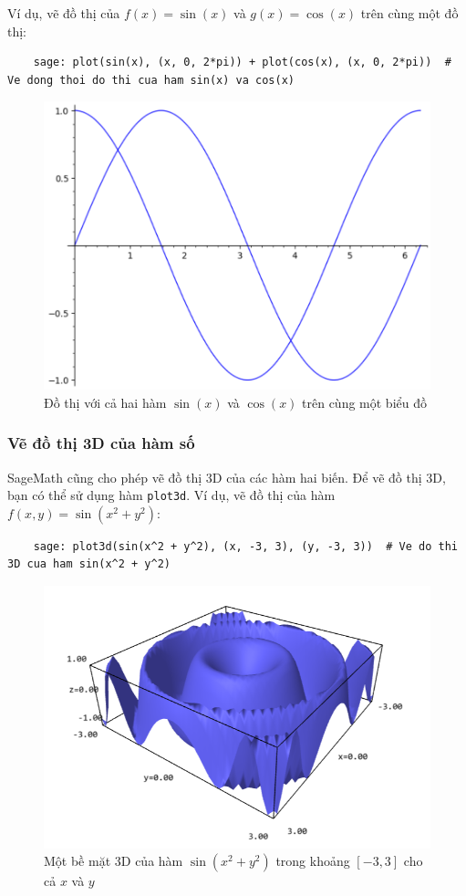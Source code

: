Ví dụ, vẽ đồ thị của \( f(x) = \sin(x) \) và \( g(x) = \cos(x) \) trên cùng một đồ thị:

\begin{lstlisting}
	sage: plot(sin(x), (x, 0, 2*pi)) + plot(cos(x), (x, 0, 2*pi))  # Ve dong thoi do thi cua ham sin(x) va cos(x)
\end{lstlisting}
\begin{figure}
	\centering
	\includegraphics[width=0.5\linewidth]{images/screenshot009}
	\caption{Đồ thị với cả hai hàm \(\sin(x)\) và \(\cos(x)\) trên cùng một biểu đồ}
	\label{fig:screenshot009}
\end{figure}

\subsubsection{Vẽ đồ thị 3D của hàm số}

SageMath cũng cho phép vẽ đồ thị 3D của các hàm hai biến. Để vẽ đồ thị 3D, bạn có thể sử dụng hàm \texttt{plot3d}. Ví dụ, vẽ đồ thị của hàm \( f(x, y) = \sin(x^2 + y^2) \):

\begin{lstlisting}
	sage: plot3d(sin(x^2 + y^2), (x, -3, 3), (y, -3, 3))  # Ve do thi 3D cua ham sin(x^2 + y^2)
\end{lstlisting}
\begin{figure}
	\centering
	\includegraphics[width=0.7\linewidth]{images/screenshot010}
	\caption{Một bề mặt 3D của hàm \( \sin(x^2 + y^2) \) trong khoảng \([-3, 3]\) cho cả \(x\) và \(y\)}
	\label{fig:screenshot010}
\end{figure}

